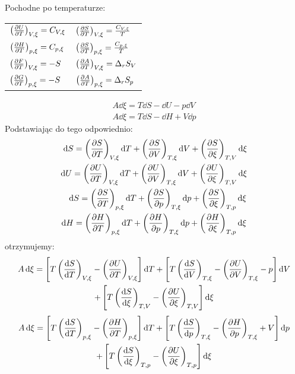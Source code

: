 \documentclass[10pt, a4paper, twoside, onecolumn]{article}
\numberwithin{equation}{section}
\begin{document}
	Pochodne po temperaturze:
	\begin{table}[H]
	\centering
	\begin{tabular}{ll}
		\(\left(\pdv{U}{T}\right)_{V, \xi}=C_{V, \xi}\) & \(\left(\pdv{S}{T}\right)_{V, \xi}=\frac{C_{V, \xi}}{T}\) \\
		\(\left(\pdv{H}{T}\right)_{p, \xi}=C_{p, \xi}\) & \(\left(\pdv{S}{T}\right)_{p, \xi}=\frac{C_{p, \xi}}{T}\) \\
		\(\left(\pdv{F}{T}\right)_{V, \xi}=-S\) & \(\left(\pdv{A}{T}\right)_{V, \xi}=\Delta_{r}S_{V}\) \\
		\(\left(\pdv{G}{T}\right)_{p, \xi}=-S\) & \(\left(\pdv{A}{T}\right)_{p, \xi}=\Delta_{r}S_{p}\)
	\end{tabular}
	\end{table}
	\begin{gather}
		A\dd{\xi}=T\dd{S}-\dd{U}-p\dd{V} \\
		A\dd{\xi}=T\dd{S}-\dd{H}+V\dd{p}
	\end{gather}
	Podstawiając do tego odpowiednio: 
	\begin{gather}
	\begin{split}
		\dd{S}=\left(\pdv{S}{T}\right)_{V, \xi}\dd{T}+\left(\pdv{S}{V}\right)_{T, \xi}\dd{V}+\left(\pdv{S}{\xi}\right)_{T, V}\dd{\xi} \\
		\dd{U}=\left(\pdv{U}{T}\right)_{V, \xi}\dd{T}+\left(\pdv{U}{V}\right)_{T, \xi}\dd{V}+\left(\pdv{U}{\xi}\right)_{T, V}\dd{\xi}
	\end{split} \\
	\begin{split}
		\dd{S}=\left(\pdv{S}{T}\right)_{p, \xi}\dd{T}+\left(\pdv{S}{p}\right)_{T, \xi}\dd{p}+\left(\pdv{S}{\xi}\right)_{T, p}\dd{\xi} \\
		\dd{H}=\left(\pdv{H}{T}\right)_{p, \xi}\dd{T}+\left(\pdv{H}{p}\right)_{T, \xi}\dd{p}+\left(\pdv{H}{\xi}\right)_{T, p}\dd{\xi}
	\end{split}
	\end{gather}
	otrzymujemy:
	\begin{multline}
		A\dd{\xi}=\left[T\left(\dv{S}{T}\right)_{V, \xi}-\left(\pdv{U}{T}\right)_{V, \xi}\right]\dd{T}+\left[T\left(\dv{S}{V}\right)_{T, \xi}-\left(\pdv{U}{V}\right)_{T, \xi}-p\right]\dd{V} \\
		+\left[T\left(\dv{S}{\xi}\right)_{T, V}-\left(\pdv{U}{\xi}\right)_{T, V}\right]\dd{\xi}
	\end{multline}
	\begin{multline}
		A\dd{\xi}=\left[T\left(\dv{S}{T}\right)_{p, \xi}-\left(\pdv{H}{T}\right)_{p, \xi}\right]\dd{T}+\left[T\left(\dv{S}{p}\right)_{T, \xi}-\left(\pdv{H}{p}\right)_{T, \xi}+V\right]\dd{p} \\
		+\left[T\left(\dv{S}{\xi}\right)_{T, p}-\left(\pdv{U}{\xi}\right)_{T, p}\right]\dd{\xi}
	\end{multline}
\end{document}

